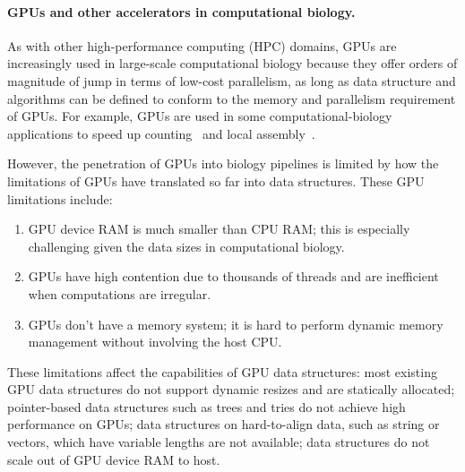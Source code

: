 \paragraph{GPUs and other accelerators in computational biology.}
As with other high-performance computing (HPC) domains,
GPUs are increasingly used in large-scale computational biology because they offer orders of magnitude of jump in terms of low-cost parallelism, as long as data structure and algorithms can be defined to conform to the memory and parallelism requirement of GPUs.
%
For example, GPUs are used in some computational-biology applications to speed up \kmer counting~\cite{nisa2021distributed} and local assembly~\cite{awan2021accelerating}.

However, the penetration of GPUs into biology pipelines is limited by how the limitations of GPUs have translated so far into data structures.  These GPU limitations include:
\begin{enumerate}
  \item GPU device RAM is much smaller than CPU RAM; this is especially
    challenging given the data sizes in computational biology.
  \item GPUs have high contention due to thousands of threads and are
    inefficient when computations are irregular.
  \item GPUs don't have a memory system; it is hard to perform dynamic memory management without involving the host CPU.
\end{enumerate}

These limitations affect the capabilities of GPU data structures: most existing GPU data structures do not support dynamic resizes and are statically allocated; pointer-based data structures such as trees and tries do not achieve high performance on GPUs; data structures on hard-to-align data, such as string or vectors, which have variable lengths are not available; data structures do not scale out of GPU device RAM to host.

